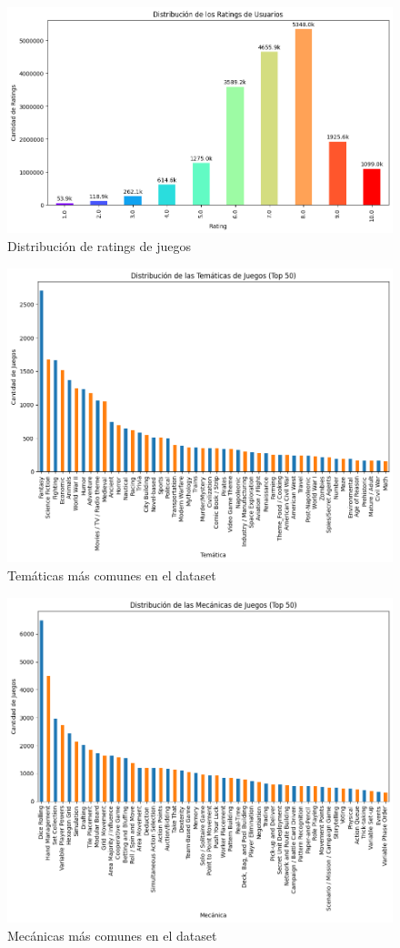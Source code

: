 \documentclass[11pt]{article}
\begin{document}
\begin{figure}[h]
    \centering
    \includegraphics[width=0.8\linewidth]{distribucionRatings.png}
    \caption{Distribución de ratings de juegos}
    \label{fig:distribucionRatings}
\end{figure}

\begin{figure}[h]
    \centering
    \includegraphics[width=0.8\linewidth]{tematicasComunes.png}
    \caption{Temáticas más comunes en el dataset}
    \label{fig:tematicasComunes}
\end{figure}

\begin{figure}[h]
    \centering
    \includegraphics[width=0.8\linewidth]{mecanicasComunes.png}
    \caption{Mecánicas más comunes en el dataset}
    \label{fig:mecanicasComunes}
\end{figure}
\end{document}
